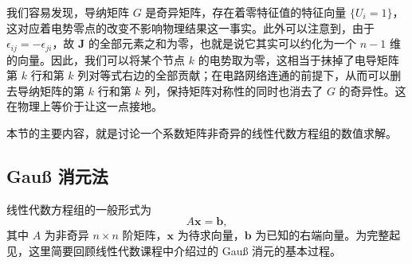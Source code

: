 我们容易发现，导纳矩阵 $G$ 是奇异矩阵，存在着零特征值的特征向量 $\{U_i=1\}$，这对应着电势零点的改变不影响物理结果这一事实。此外可以注意到，由于 $\epsilon_{ij}=-\epsilon_{ji}$，故 $\bm J$ 的全部元素之和为零，也就是说它其实可以约化为一个 $n-1$ 维的向量。因此，我们可以将某个节点 $k$ 的电势取为零，这相当于抹掉了电导矩阵第 $k$ 行和第 $k$ 列对等式右边的全部贡献；在电路网络连通的前提下，从而可以删去导纳矩阵的第 $k$ 行和第 $k$ 列，保持矩阵对称性的同时也消去了 $G$ 的奇异性。这在物理上等价于让这一点接地。

本节的主要内容，就是讨论一个系数矩阵非奇异的线性代数方程组的数值求解。

\subsection{Gauß 消元法}

线性代数方程组的一般形式为
\begin{equation}
A\bm x=\bm b,
\tag{3.1.6}
\end{equation}
其中 $A$ 为非奇异 $n\times n$ 阶矩阵，$\bm x$ 为待求向量，$\bm b$ 为已知的右端向量。为完整起见，这里简要回顾线性代数课程中介绍过的 Gauß 消元的基本过程。


